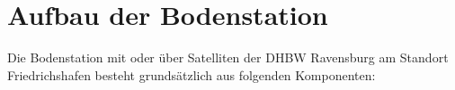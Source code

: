 

\chapter{Aufbau der Bodenstation}
\label{chap:bodenstation}
Die Bodenstation mit oder über Satelliten der DHBW Ravensburg am Standort Friedrichshafen besteht grundsätzlich aus folgenden 
Komponenten:
